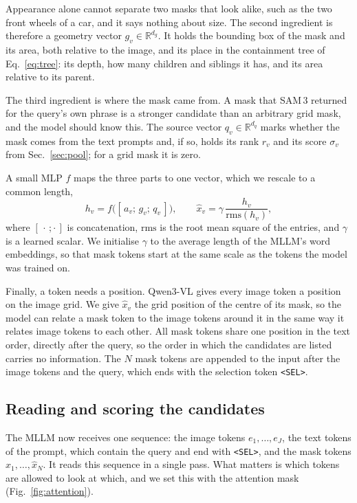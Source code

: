 Appearance alone cannot separate two masks that look alike, such as the two front wheels of a car, and it says
nothing about size. The second ingredient is therefore a geometry vector $g_v\in\mathbb{R}^{d_g}$. It holds the
bounding box of the mask and its area, both relative to the image, and its place in the containment tree of
Eq.~\eqref{eq:tree}: its depth, how many children and siblings it has, and its area relative to its parent.

The third ingredient is where the mask came from. A mask that SAM\,3 returned for the query's own phrase is a
stronger candidate than an arbitrary grid mask, and the model should know this. The source vector
$q_v\in\mathbb{R}^{d_q}$ marks whether the mask comes from the text prompts and, if so, holds its rank $r_v$ and
its score $\sigma_v$ from Sec.~\ref{sec:pool}; for a grid mask it is zero.

A small MLP $f$ maps the three parts to one vector, which we rescale to a common length,
\begin{equation}
  h_v=f\big([\,a_v;\,g_v;\,q_v\,]\big), \qquad \hat{x}_v=\gamma\,\frac{h_v}{\mathrm{rms}(h_v)},
  \label{eq:token}
\end{equation}
where $[\,\cdot\,;\cdot\,]$ is concatenation, $\mathrm{rms}$ is the root mean square of the entries, and $\gamma$ is
a learned scalar. We initialise $\gamma$ to the average length of the MLLM's word embeddings, so that mask tokens
start at the same scale as the tokens the model was trained on.

Finally, a token needs a position. Qwen3-VL gives every image token a position on the image grid. We give
$\hat{x}_v$ the grid position of the centre of its mask, so the model can relate a mask token to the image tokens
around it in the same way it relates image tokens to each other. All mask tokens share one position in the text
order, directly after the query, so the order in which the candidates are listed carries no information. The $N$
mask tokens are appended to the input after the image tokens and the query, which ends with the selection token
\texttt{<SEL>}.

\subsection{Reading and scoring the candidates}
\label{sec:selection}

The MLLM now receives one sequence: the image tokens $e_1,\dots,e_J$, the text tokens of the prompt, which contain
the query and end with \texttt{<SEL>}, and the mask tokens $\hat{x}_1,\dots,\hat{x}_N$. It reads this sequence in a
single pass. What matters is which tokens are allowed to look at which, and we set this with the attention mask
(Fig.~\ref{fig:attention}).

